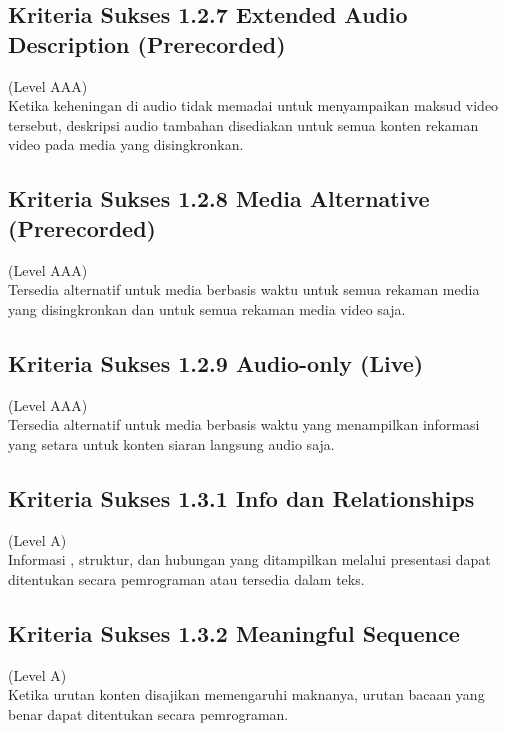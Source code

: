 \subsection{Kriteria Sukses 1.2.7 Extended Audio Description (Prerecorded)}
\label{subsec:kriteria_1.2.7}
(Level AAA) \\

Ketika keheningan di audio tidak memadai untuk menyampaikan maksud video tersebut, deskripsi audio tambahan disediakan untuk semua konten rekaman video pada media yang disingkronkan. 


\subsection{Kriteria Sukses 1.2.8 Media Alternative (Prerecorded)}
\label{subsec:kriteria_1.2.8}
(Level AAA) \\

Tersedia alternatif untuk media berbasis waktu untuk semua rekaman media yang disingkronkan dan untuk semua rekaman media video saja.

\subsection{Kriteria Sukses 1.2.9 Audio-only (Live)}
\label{subsec:kriteria_1.2.9}
(Level AAA) \\

Tersedia alternatif untuk media berbasis waktu yang menampilkan informasi yang setara untuk konten siaran langsung audio saja.


\subsection{Kriteria Sukses 1.3.1 Info dan Relationships}
\label{subsec:kriteria_1.3.1}
(Level A) \\

Informasi , struktur, dan hubungan yang ditampilkan melalui presentasi dapat ditentukan secara pemrograman atau tersedia dalam teks.


\subsection{Kriteria Sukses 1.3.2 Meaningful Sequence}
\label{subsec:kriteria_1.3.2}
(Level A) \\

Ketika urutan konten disajikan memengaruhi maknanya, urutan bacaan yang benar dapat ditentukan secara pemrograman.



